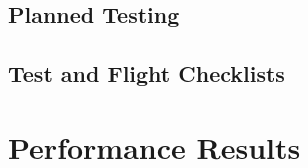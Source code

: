 \documentclass[report]{byu-aero}
\begin{document}
\subsection{Planned Testing}
\label{ssec:plannedtesting}



\subsection{Test and Flight Checklists}



\section{Performance Results} %
\label{sec:PerformanceResults}






{}

\end{document}
